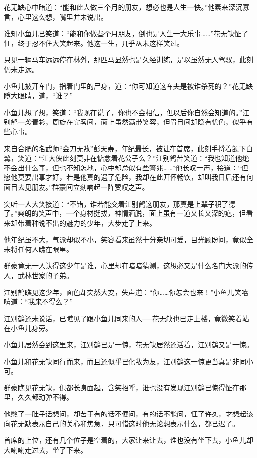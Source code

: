 \documentclass[12pt,oneside]{book}
\begin{document}
花无缺心中暗道：``能和此人做三个月的朋友，想必也是人生一快。''他素来深沉寡言，心里这么想，嘴里并末说出。

谁知小鱼儿已笑道：``能和你做叁个月朋友，倒也是人生一大乐事\ldots\ldots{}''花无缺怔了怔，终于忍不住大笑起来。他这一生，几乎从未这样笑过。

只见一辆马车远远停在林外，那匹马显然也是久经训练，是以虽然无人驾驭，此刻仍未走远。

小鱼儿披开车门，指着门里的尸身，道：``你可知道这车夫是被谁杀死的？''花无缺瞪大眼睛，道，``谁？''

小鱼儿想了想，笑道：``我现在说了，你也不会相信，但以后你自然会知道的。''江别鹤一袭青衫，周旋在宾客间，面上虽然满带笑容，但眉目间却隐有忧色，似乎有些心事。

来自合肥的名武师``金刀无敌''彭天寿，年纪最长，被让在首席，此刻手捋着颔下白髯，笑道：``江大侠此刻莫非在惦念着花公子么？''江别鹤苦笑道：``我也知道他绝不会出什么事，但也不知怎地，心中却总似有些警兆\ldots\ldots{}''他长叹一声，接道：``但愿他莫要出事才好，若是他真的遇了危险，我却在此开怀畅饮，却叫我日后还有何面目去见朋友。''群豪间立刻响起一阵赞叹之声。

突听一人大笑接道：``不错，谁若能交着江别鹤这朋友，那真是上辈子积了德了。''爽朗的笑声中，一个身材挺拔，神情洒脱，面上虽有一道又长又深的疤，但看来却带着种说不出的魅力的少年，大步走了上来。

他年纪虽不大，气派却似不小，笑容看来虽然十分亲切可爱，目光顾盼间，竟似全未将任何人瞧在眼里。

群豪竟无一人认得这少年是谁，心里却在暗暗猜测，这想必又是什么名门大派的传人，武林世家的子弟。

江别鹤瞧见这少年，面色却突然大变，失声道：``你\ldots\ldots 你怎会也来！''小鱼儿笑嘻嘻道：``我来不得么？''

江别鹤还未说话，已瞧见了跟小鱼儿同来的人──花无缺也已走上楼，竟微笑着站在小鱼儿身旁。

小鱼儿居然会到这里来，江别鹤已是一惊，花无缺居然还活着，江别鹤又是一惊。

小鱼儿和花无缺同行而来，而且还似乎已化敌为友，江别鹤这一惊更当真是非同小可。

群豪瞧见花无缺，俱都长身面起，含笑招呼，谁也没有发现江别鹤已惊得怔在那里，久久都动弹不得。

他憋了一肚子话想问，却苦于有的话不便问，有的话不能问，怔了许久，才想起该向花无缺表示自己的关心和焦急．只可惜这时他无论想表示什么，都已迟了。

首席的上位，还有几个位子是空着的，大家让来让去，谁也没有坐下去，小鱼儿却大喇喇走过去，坐了下来。
\end{document}

